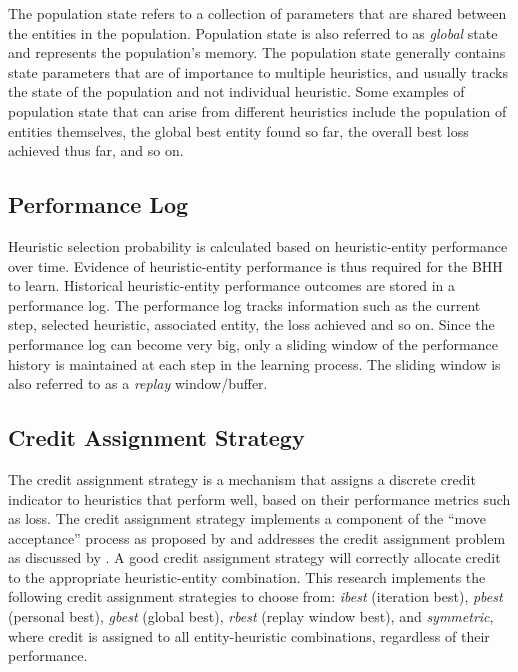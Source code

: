 The population state refers to a collection of parameters that are shared between the entities in the population. Population state is also referred to as \textit{global} state and represents the population's memory. The population state generally contains state parameters that are of importance to multiple heuristics, and usually tracks the state of the population and not individual heuristic. Some examples of population state that can arise from different heuristics include the population of entities themselves, the global best entity found so far, the overall best loss achieved thus far, and so on.

\subsection{Performance Log}\label{sec:bhh:performance_log}

Heuristic selection probability is calculated based on heuristic-entity performance over time. Evidence of heuristic-entity performance is thus required for the \acs{BHH} to learn. Historical heuristic-entity performance outcomes are stored in a performance log. The performance log tracks information such as the current step, selected heuristic, associated entity, the loss achieved and so on. Since the performance log can become very big, only a sliding window of the performance history is maintained at each step in the learning process. The sliding window is also referred to as a \textit{replay} window/buffer.

\subsection{Credit Assignment Strategy}
\label{sec:bhh:credit_assignment_strategy}

The credit assignment strategy is a mechanism that assigns a discrete credit indicator to heuristics that perform well, based on their performance metrics such as loss. The credit assignment strategy implements a component of the ``move acceptance'' process as proposed by \citeauthor{ref:ozcan:2006} \cite{ref:ozcan:2006} and addresses the credit assignment problem as discussed by \citeauthor{ref:burke:2010} \cite{ref:burke:2010}. A good credit assignment strategy will correctly allocate credit to the appropriate heuristic-entity combination. This research implements the following credit assignment strategies to choose from: \textit{ibest} (iteration best), \textit{pbest} (personal best), \textit{gbest} (global best), \textit{rbest} (replay window best), and \textit{symmetric}, where credit is assigned to all entity-heuristic combinations, regardless of their performance.


